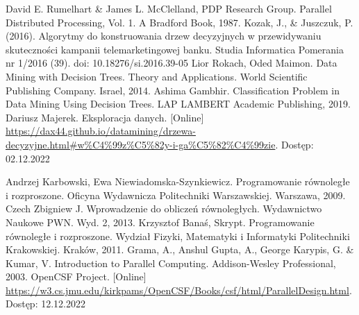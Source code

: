 \documentclass[12pt]{article}
\begin{document}
\cleardoublepage
{}
{}
\begin{thebibliography}{20}

     David E. Rumelhart \& James L. McClelland, PDP Research Group. Parallel Distributed Processing, Vol. 1. A Bradford Book, 1987.
     Kozak, J., \& Juszczuk, P. (2016). Algorytmy do konstruowania drzew decyzyjnych w przewidywaniu skuteczności kampanii telemarketingowej banku. Studia Informatica Pomerania nr 1/2016 (39). doi: 10.18276/si.2016.39-05
     Lior Rokach, Oded Maimon. Data Mining with Decision Trees. Theory and Applications. World Scientific Publishing Company. Israel, 2014.
     Ashima Gambhir. Classification Problem in Data Mining Using Decision Trees. LAP LAMBERT Academic Publishing, 2019.
     Dariusz Majerek. Eksploracja danych. [Online] \url{https://dax44.github.io/datamining/drzewa-decyzyjne.html#w%C4%99z%C5%82y-i-ga%C5%82%C4%99zie}. Dostęp: 02.12.2022
   
     Andrzej Karbowski, Ewa Niewiadomska-Szynkiewicz. Programowanie równoległe i rozproszone. Oficyna Wydawnicza Politechniki Warszawskiej. Warszawa, 2009.
     Czech Zbigniew J. Wprowadzenie do obliczeń równoległych. Wydawnictwo Naukowe PWN. Wyd. 2, 2013.
     Krzysztof Banaś, Skrypt. Programowanie równoległe i rozproszone. Wydział Fizyki, Matematyki i Informatyki Politechniki Krakowskiej. Kraków, 2011.
     Grama, A., Anshul Gupta, A., George Karypis, G. \& Kumar, V. Introduction to Parallel Computing. Addison-Wesley Professional, 2003.
     OpenCSF Project. [Online] \url{https://w3.cs.jmu.edu/kirkpams/OpenCSF/Books/csf/html/ParallelDesign.html}. Dostęp: 12.12.2022


\end{thebibliography}
\end{document}
